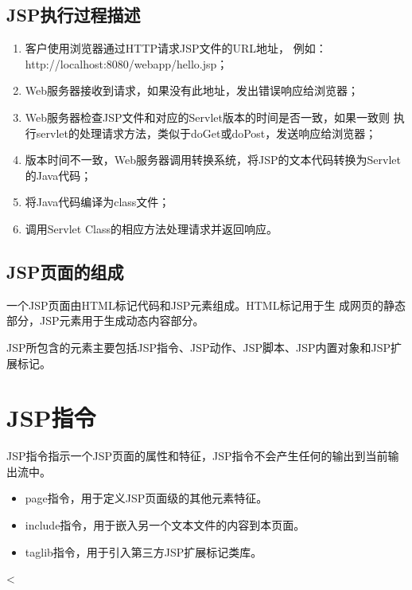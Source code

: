 \subsection{JSP执行过程描述} 

\begin{enumerate}\kai
\item 客户使用浏览器通过HTTP请求JSP文件的URL地址，
  例如：http://localhost:8080/webapp/hello.jsp；
\item Web服务器接收到请求，如果没有此地址，发出错误响应给浏览器；
\item Web服务器检查JSP文件和对应的Servlet版本的时间是否一致，如果一致则
  执行servlet的处理请求方法，类似于doGet或doPost，发送响应给浏览器；
\item 版本时间不一致，Web服务器调用转换系统，将JSP的文本代码转换为Servlet的Java代码；
\item 将Java代码编译为class文件；
\item 调用Servlet Class的相应方法处理请求并返回响应。
\end{enumerate}

\subsection{JSP页面的组成} 

一个JSP页面由{\hei HTML标记代码}和{\hei JSP元素}组成。HTML标记用于生
成网页的静态部分，JSP元素用于生成动态内容部分。

JSP所包含的元素主要包括JSP指令、JSP动作、JSP脚本、JSP内置对象和JSP扩展标记。

\section{JSP指令}

JSP指令指示一个JSP页面的属性和特征，JSP指令不会产生任何的输出到当前输出流中。

\begin{itemize}
\item page指令，用于定义JSP页面级的其他元素特征。
\item include指令，用于嵌入另一个文本文件的内容到本页面。
\item taglib指令，用于引入第三方JSP扩展标记类库。
\end{itemize}


\begin{jspCode}
  <%
\end{jspCode}
  
